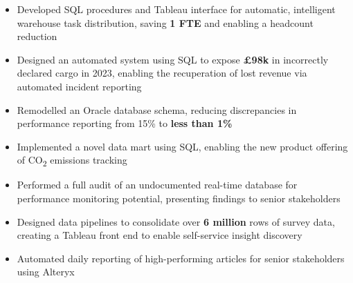 \begin{paracol}{2}
\begin{itemize}

\medskip
{}

\end{itemize}

\divider

\begin{itemize}
\item Developed SQL procedures and Tableau interface for automatic, intelligent warehouse task distribution, saving \textbf{1 FTE} and enabling a headcount reduction
\item Designed an automated system using SQL to expose \textbf{£98k} in incorrectly declared cargo in 2023, enabling the recuperation of lost revenue via automated incident reporting
\item Remodelled an Oracle database schema, reducing discrepancies in performance reporting from 15\% to \textbf{less than 1\%}
\item Implemented a novel data mart using SQL, enabling the new product offering of CO\textsubscript{2} emissions tracking
\item Performed a full audit of an undocumented real-time database for performance monitoring potential, presenting findings to senior stakeholders

\medskip
{}

\end{itemize}

\divider

\begin{itemize}
\item Designed data pipelines to consolidate over \textbf{6 million} rows of survey data, creating a Tableau front end to enable self-service insight discovery
\item Automated daily reporting of high-performing articles for senior stakeholders using Alteryx


\end{itemize}
\end{paracol}
